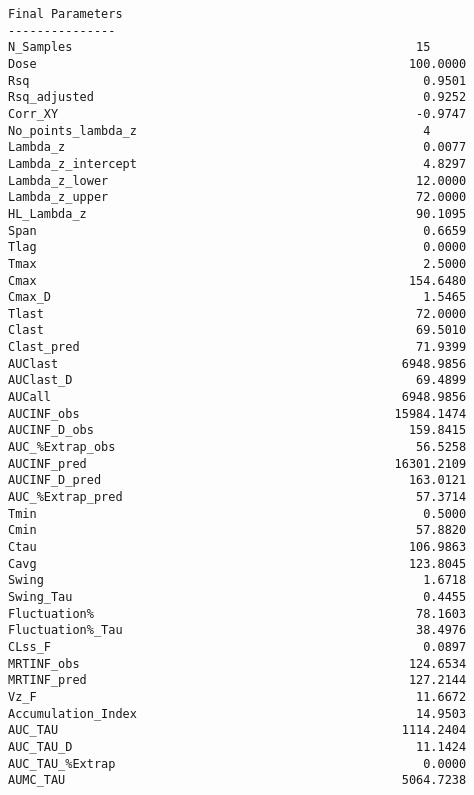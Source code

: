 \documentclass[12pt,a4paper]{article}
\begin{document}
\begin{verbatim}
Final Parameters
---------------
N_Samples                                                15
Dose                                                    100.0000
Rsq                                                       0.9501
Rsq_adjusted                                              0.9252
Corr_XY                                                  -0.9747
No_points_lambda_z                                        4
Lambda_z                                                  0.0077
Lambda_z_intercept                                        4.8297
Lambda_z_lower                                           12.0000
Lambda_z_upper                                           72.0000
HL_Lambda_z                                              90.1095
Span                                                      0.6659
Tlag                                                      0.0000
Tmax                                                      2.5000
Cmax                                                    154.6480
Cmax_D                                                    1.5465
Tlast                                                    72.0000
Clast                                                    69.5010
Clast_pred                                               71.9399
AUClast                                                6948.9856
AUClast_D                                                69.4899
AUCall                                                 6948.9856
AUCINF_obs                                            15984.1474
AUCINF_D_obs                                            159.8415
AUC_%Extrap_obs                                          56.5258
AUCINF_pred                                           16301.2109
AUCINF_D_pred                                           163.0121
AUC_%Extrap_pred                                         57.3714
Tmin                                                      0.5000
Cmin                                                     57.8820
Ctau                                                    106.9863
Cavg                                                    123.8045
Swing                                                     1.6718
Swing_Tau                                                 0.4455
Fluctuation%                                             78.1603
Fluctuation%_Tau                                         38.4976
CLss_F                                                    0.0897
MRTINF_obs                                              124.6534
MRTINF_pred                                             127.2144
Vz_F                                                     11.6672
Accumulation_Index                                       14.9503
AUC_TAU                                                1114.2404
AUC_TAU_D                                                11.1424
AUC_TAU_%Extrap                                           0.0000
AUMC_TAU                                               5064.7238




\end{verbatim}
\end{document}
